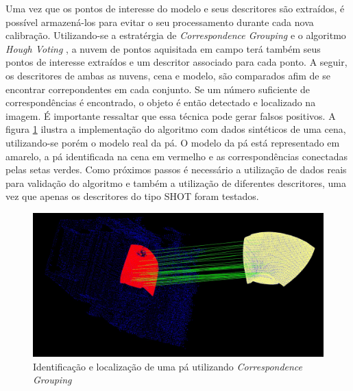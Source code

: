 Uma vez que os pontos de interesse do modelo e seus descritores são extraídos, é
possível armazená-los para evitar o seu processamento  durante cada nova
calibração. Utilizando-se a estratérgia de
\textit{Correspondence Grouping} e o algoritmo \textit{Hough Voting}
\cite{Tombari2010a}, a nuvem de pontos aquisitada em campo terá também seus
pontos de interesse extraídos e um descritor associado para cada ponto. A
seguir, os descritores de ambas as nuvens, cena e modelo, são comparados afim de
se encontrar correpondentes em cada conjunto. Se um número suficiente de
correspondências é encontrado, o objeto é então detectado e localizado na
imagem. É importante ressaltar que essa técnica pode gerar falsos positivos. A
figura \ref{fig::correspondence} ilustra a implementação do algoritmo com 
dados sintéticos de uma cena, utilizando-se porém o modelo real da pá. O modelo
da pá está representado em amarelo, a pá identificada na cena em vermelho e as correspondências
conectadas pelas setas verdes.
Como próximos passos é necessário a utilização de dados reais para validação do
algoritmo e também a utilização de diferentes descritores, uma vez que apenas os
descritores do tipo SHOT foram testados.

\begin{figure}[h!]
   \centering
   \includegraphics[width=0.8\columnwidth]{detail/figs/localizacao/correspondence}
   \caption{Identificação e localização de uma pá utilizando
   \textit{Correspondence Grouping}}
   \label{fig::correspondence}
\end{figure}



